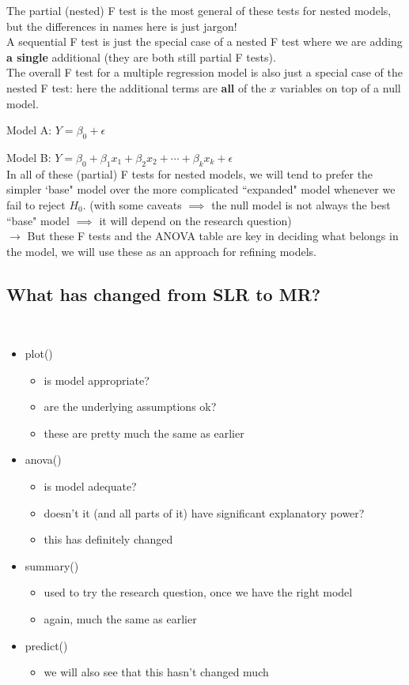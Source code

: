 \documentclass[a4paper, 11pt, twoside]{article}
\begin{document}
The partial (nested) F test is the most general of these tests for nested models, but the differences in names here is just jargon!\\

A sequential F test is just the special case of a nested F test where we are adding \textbf{a single} additional (they are both still partial F tests).\\

The overall F test for a multiple regression model is also just a special case of the nested F test: here the additional terms are \textbf{all} of the $x$ variables on top of a null model.

Model A: $Y=\beta_0+\epsilon$

Model B: $Y=\beta_0+\beta_1x_1+\beta_2x_2+\cdots +\beta_kx_k+\epsilon$\\

In all of these (partial) F tests for nested models, we will tend to prefer the simpler `base" model over the more complicated ``expanded" model whenever we fail to reject $H_0$. (with some caveats $\implies$ the null model is not always the best ``base" model $\implies$ it will depend on the research question)\\

$\rightarrow$ But these F tests and the ANOVA table are key in deciding what belongs in the model, we will use these as an approach for refining models.\\

\subsection{What has changed from SLR to MR?}\

\begin{itemize}
	\item plot()
	\begin{itemize}
		\item is model appropriate? 
		\item are the underlying assumptions ok?
		\item these are pretty much the same as earlier
	\end{itemize}
	\item anova()
	\begin{itemize}
		\item  is model adequate? 
		\item doesn't it (and all parts of it) have significant explanatory power?
		\item this has definitely changed
	\end{itemize}
	\item summary()
	\begin{itemize}
		\item used to try the research question, once we have the right model
		\item again, much the same as earlier
	\end{itemize}
	\item predict()
		\begin{itemize}
			\item we will also see that this hasn't changed much
		\end{itemize}
\end{itemize}
\end{document}
